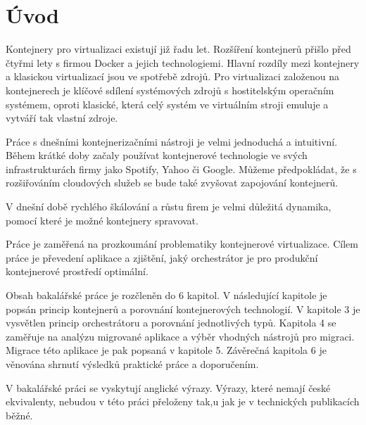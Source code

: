 \chapter{Úvod}
\setcounter{page}{1}
Kontejnery pro virtualizaci existují již řadu let. Rozšíření kontejnerů přišlo před čtyřmi lety s firmou Docker a jejich technologiemi. Hlavní rozdíly mezi kontejnery a klasickou virtualizací jsou ve spotřebě zdrojů. \newline
Pro virtualizaci založenou na kontejnerech je klíčové sdílení systémových zdrojů s hostitelským operačním systémem, oproti klasické, která celý systém ve virtuálním stroji emuluje a vytváří tak vlastní zdroje.

Práce s dnešními kontejnerizačními nástroji je velmi jednoduchá a intuitivní. Během krátké doby začaly používat kontejnerové technologie ve svých infrastrukturách firmy jako Spotify, Yahoo či Google\cite{docker_part}. Můžeme předpokládat, že s rozšiřováním cloudových služeb se bude také zvyšovat zapojování kontejnerů.

V dnešní době rychlého škálování a růstu firem je velmi důležitá dynamika, pomocí které je možné kontejnery spravovat.

Práce je zaměřená na prozkoumání problematiky kontejnerové virtualizace. Cílem práce je převedení aplikace a zjištění, jaký orchestrátor je pro produkční kontejnerové prostředí optimální.

Obsah bakalářské práce je rozčleněn do 6 kapitol. V následující kapitole je popsán princip kontejnerů a porovnání kontejnerových technologií. V kapitole 3 je vysvětlen princip orchestrátoru a porovnání jednotlivých typů. Kapitola 4 se zaměřuje na analýzu migrované aplikace a výběr vhodných nástrojů pro migraci. Migrace této aplikace je pak  popsaná v kapitole 5. Závěrečná kapitola 6 je věnována shrnutí výsledků praktické práce a doporučením.

V bakalářské práci se vyskytují anglické výrazy. Výrazy, které nemají české ekvivalenty, nebudou v této práci přeloženy tak,u jak je v technických publikacích běžné.
